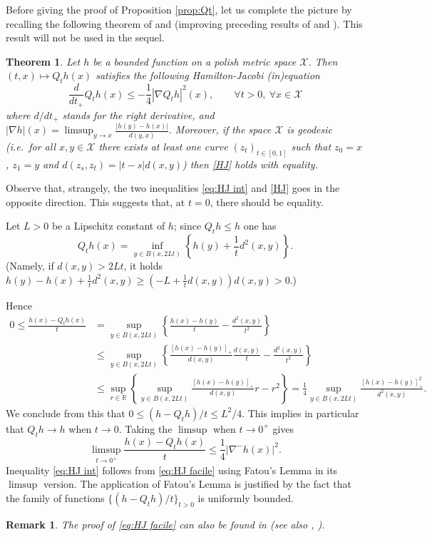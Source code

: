 \documentclass[11pt]{amsart}
\newtheorem{thm}[equation]{Theorem}
\newtheorem{rem}[equation]{Remark}
\numberwithin{equation}{section}
\begin{document}
Before giving the proof of Proposition \ref{prop:Qt}, let us complete the picture by recalling the following theorem of \cite{AGS12} and \cite{GRS12bis} (improving preceding results of \cite{LV07} and \cite{Ba12}). This result will not be used in the sequel. 
\begin{thm} Let $h$ be a bounded function on a polish metric space ${\mathcal{X}}$. Then $(t,x)\mapsto Q_th(x)$ satisfies the following Hamilton-Jacobi (in)equation
\begin{equation}\label{HJ}
\frac{d}{dt_+} Q_th(x) \leq -\frac{1}{4}|\nabla Q_th|^2(x), \qquad \forall t>0,\ \forall x\in {\mathcal{X}}
\end{equation}
where $d/dt_+$ stands for the right derivative, and $|\nabla h|(x)=\limsup_{y\to x}\frac{|h(y)-h(x)|}{d(y,x)}.$
Moreover, if the space ${\mathcal{X}}$ is geodesic (\textit{i.e.}\ for all $x,y\in {\mathcal{X}}$ there exists at least one curve $(z_t)_{t\in [0,1]}$ such that $z_0=x$, $z_1=y$ and $d(z_s,z_t)=|t-s|d(x,y)$) then \eqref{HJ} holds with equality.
\end{thm}

Observe that, strangely, the two inequalities \eqref{eq:HJ int} and \eqref{HJ} goes in the opposite direction.
This suggests that, at $t=0$, there should be equality.

\noindent
Let $L>0$ be a Lipschitz constant of $h$; since $Q_t h \leq h$ one has 
$$Q_th(x)=\inf_{y\in B(x, 2Lt)} \left\{h(y)+\frac{1}{t}d^2(x,y)\right\}.$$
(Namely, if $d(x,y)>2Lt$, it holds $h(y)-h(x)+\frac{1}{t}d^2(x,y)\geq \left(-L+\frac{1}{t}d(x,y)\right)d(x,y)>0$.)

Hence
\begin{align*}
0\leq\frac{h(x)-Q_th(x)}{t}&=\sup_{y\in B(x,2Lt)}\left\{\frac{h(x)-h(y)}{t} - \frac{d^2(x,y)}{t^2}\right\}\\
&\leq \sup_{y\in B(x,2Lt)}\left\{ \frac{[h(x)-h(y)]_+}{d(x,y)}\frac{d(x,y)}{t} - \frac{d^2(x,y)}{t^2}\right\}\\
&\leq \sup_{r \in \mathbb{R}} \left\{ \sup_{y\in B(x,2Lt)} \frac{[h(x)-h(y)]_+}{d(x,y)}r - r^2\right\}
=  \frac{1}{4}\sup_{y\in B(x,2Lt)} \frac{[h(x)-h(y)]_+^2}{d^2(x,y)}.
\end{align*}
We conclude from this that $0\leq (h-Q_th)/t\leq L^2/4$. This implies in particular that $Q_th\to h$ when $t\to0.$ Taking the $\limsup$ when $t\to0^+$ gives 
\begin{equation}\label{eq:HJ facile}
\limsup_{t\to 0^+}\frac{h(x)-Q_th(x)}{t} \leq \frac{1}{4}|\nabla^-h(x)|^2.
\end{equation} 
Inequality \eqref{eq:HJ int} follows from \eqref{eq:HJ facile} using Fatou's Lemma in its $\limsup$ version. The application of Fatou's Lemma is justified by the fact that the family of functions $\{(h-Q_th)/t\}_{t>0}$ is uniformly bounded. 
\endproof
\begin{rem}The proof of \eqref{eq:HJ facile} can also be found in \cite[Theorem 22.46]{Vi09}  (see also \cite[Proposition A.3]{GRS12bis}, \cite{LV07,Ba12,AGS12}).
\end{rem}
\end{document}
